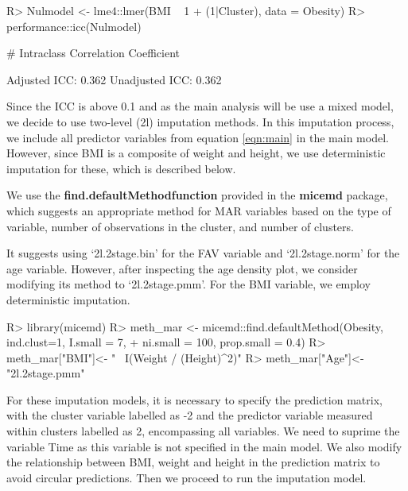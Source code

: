\documentclass[
]{jss}
\begin{document}
\begin{CodeChunk}
\begin{CodeInput}
R> Nulmodel <- lme4::lmer(BMI ~ 1 + (1|Cluster), data = Obesity)
R> performance::icc(Nulmodel)
\end{CodeInput}
\begin{CodeOutput}
# Intraclass Correlation Coefficient

    Adjusted ICC: 0.362
  Unadjusted ICC: 0.362
\end{CodeOutput}
\end{CodeChunk}

Since the ICC is above 0.1 and as the main analysis will be use a mixed
model, we decide to use two-level (2l) imputation methods. In this
imputation process, we include all predictor variables from equation
\ref{eqn:main} in the main model. However, since BMI is a composite of
weight and height, we use deterministic imputation for these, which is
described below.

We use the \textbf{find.defaultMethodfunction} provided in the
\textbf{micemd} package, which suggests an appropriate method for MAR
variables based on the type of variable, number of observations in the
cluster, and number of clusters.

It suggests using `2l.2stage.bin' for the FAV variable and
`2l.2stage.norm' for the age variable. However, after inspecting the age
density plot, we consider modifying its method to `2l.2stage.pmm'. For
the BMI variable, we employ deterministic imputation.

\begin{CodeChunk}
\begin{CodeInput}
R> library(micemd)
R> meth_mar <- micemd::find.defaultMethod(Obesity, ind.clust=1, I.small = 7,
+                                ni.small = 100, prop.small = 0.4)
R> meth_mar["BMI"]<- "~ I(Weight / (Height)^2)"
R> meth_mar["Age"]<-"2l.2stage.pmm" 
\end{CodeInput}
\end{CodeChunk}

For these imputation models, it is necessary to specify the prediction
matrix, with the cluster variable labelled as -2 and the predictor
variable measured within clusters labelled as 2, encompassing all
variables. We need to suprime the variable Time as this variable is not
specified in the main model. We also modify the relationship between
BMI, weight and height in the prediction matrix to avoid circular
predictions. Then we proceed to run the imputation model.
\end{document}
